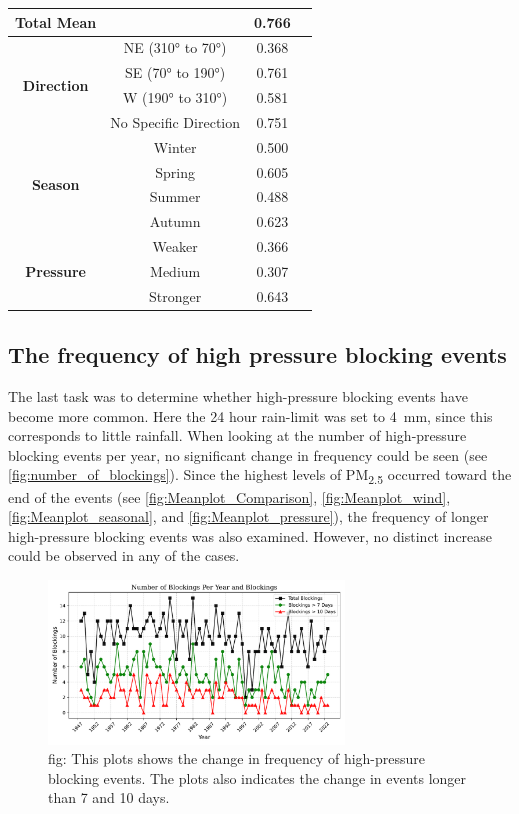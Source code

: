 \begin{table}[H]
\begin{minipage}{0.45\textwidth}
\begin{tabular}{@{}cccc@{}}
        \multirow{1}{*}{\textbf{Total Mean}} &  & 0.766 \\ \midrule    \multirow{4}{*}{\textbf{Direction}} & NE (310° to 70°)  & 0.368 \\  & SE (70° to 190°)  & 0.761 \\  & W (190° to 310°)  & 0.581 \\  & No Specific Direction  & 0.751 \\  \midrule   \multirow{4}{*}{\textbf{Season}} & Winter  & 0.500 \\  & Spring  & 0.605 \\  & Summer  & 0.488 \\  & Autumn  & 0.623 \\  \midrule    \multirow{4}{*}{\textbf{Pressure}} & Weaker  & 0.366 \\  & Medium  & 0.307 \\  & Stronger  & 0.643 \\ 
        \bottomrule
        \end{tabular}
    \end{minipage}
\end{table}


\subsection{The frequency of high pressure blocking events}
The last task was to determine whether high-pressure blocking events have become more common. Here the 24 hour rain-limit was set to \SI{4}{\mm}, since this corresponds to little rainfall. When looking at the number of high-pressure blocking events per year, no significant change in frequency could be seen (see \autoref{fig:number_of_blockings}). Since the highest levels of PM\textsubscript{2.5} occurred toward the end of the events (see \autoref{fig:Meanplot_Comparison}, \autoref{fig:Meanplot_wind}, \autoref{fig:Meanplot_seasonal}, and \autoref{fig:Meanplot_pressure}), the frequency of longer high-pressure blocking events was also examined. However, no distinct increase could be observed in any of the cases.

\begin{figure}[H]
    \centering
    \includegraphics[width=0.7\textwidth]{Figures/BlockingsPerYear.pdf}
    \caption{fig: This plots shows the change in frequency of high-pressure blocking events. The plots also indicates the change in events longer than 7 and 10 days. }
    \label{fig:number_of_blockings}
\end{figure}

